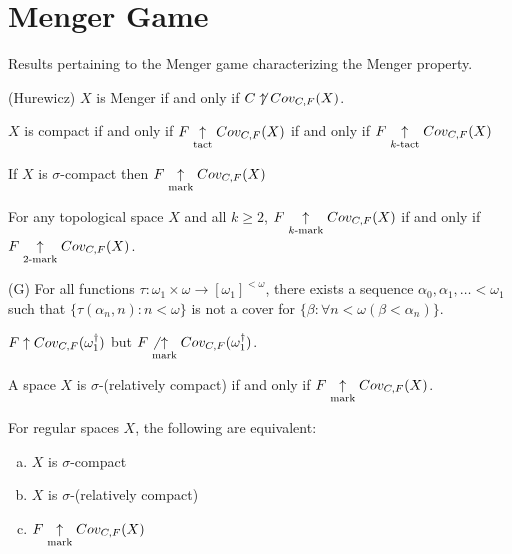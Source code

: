 
\chapter{Menger Game}

Results pertaining to the Menger game characterizing the Menger property.


  \begin{thm}(Hurewicz)
    $X$ is Menger if and only if $C \not\uparrow Cov_{C,F}(X)$.
  \end{thm}

  \begin{prop}
    $X$ is compact if and only if $F \underset{\text{tact}}{\uparrow} Cov_{C,F}(X)$ if and only if $F \underset{k\text{-tact}}{\uparrow} Cov_{C,F}(X)$
  \end{prop}

  \begin{prop}
    If $X$ is $\sigma$-compact then $F \underset{\text{mark}}{\uparrow} Cov_{C,F}(X)$
  \end{prop}

  \begin{thm}
  For any topological space $X$ and all $k \geq 2$, $F \underset{k\text{-mark}}{\uparrow} Cov_{C,F}(X)$ if and only if $F \underset{2\text{-mark}}{\uparrow} Cov_{C,F}(X)$.
  \end{thm}

  \begin{lem}(G)
    For all functions $\tau:\omega_1\times\omega \rightarrow [\omega_1]^{<\omega}$, there exists a sequence $\alpha_0, \alpha_1, \dots < \omega_1$ such that $\{\tau(\alpha_n,n): n<\omega\}$ is not a cover for $\{\beta:\forall n<\omega (\beta < \alpha_n)\}$.
  \end{lem}

  \begin{ex}
    $F \uparrow Cov_{C,F}(\omega_1^\dagger)$ but $F \not\underset{\text{mark}}{\uparrow} Cov_{C,F}(\omega_1^\dagger)$.
  \end{ex}

  \begin{thm}
    A space $X$ is $\sigma$-(relatively compact) if and only if $F \underset{\text{mark}}{\uparrow} Cov_{C,F}(X)$.
  \end{thm}

  \begin{cor}
    For regular spaces $X$, the following are equivalent:
      \begin{enumerate}[(a)]
        \item $X$ is $\sigma$-compact
        \item $X$ is $\sigma$-(relatively compact)
        \item $F \underset{\text{mark}}{\uparrow} Cov_{C,F}(X)$
      \end{enumerate}
  \end{cor}

